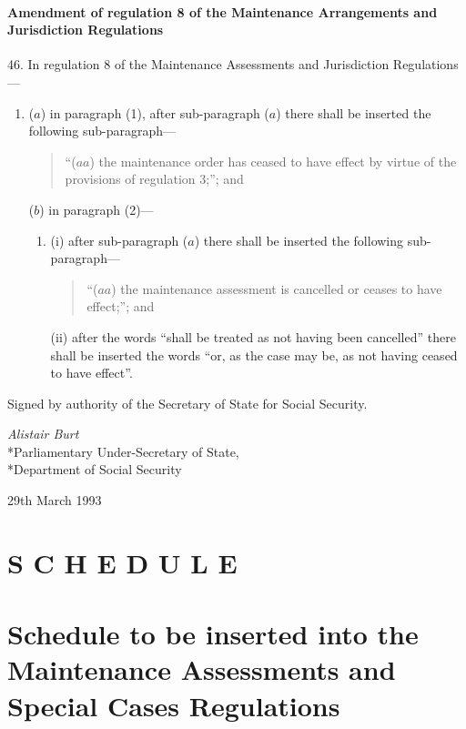 \documentclass[a4paper]{article}
\newcommand{\parthead}{}
\begin{document}
\subsection[46. Amendment of regulation 8 of the Maintenance Arrangements and Jurisdiction Regulations]{Amendment of regulation 8 of the Maintenance Arrangements and Jurisdiction Regulations}

46.  In regulation 8 of the Maintenance Assessments and Jurisdiction Regulations—
\begin{enumerate}\item[]
($a$) in paragraph (1), after sub-paragraph ($a$) there shall be inserted the following sub-paragraph---
\begin{quotation}
“($aa$) the maintenance order has ceased to have effect by virtue of the provisions of regulation 3;”; and
\end{quotation}

($b$) in paragraph (2)---
\begin{enumerate}\item[]
(i) after sub-paragraph ($a$) there shall be inserted the following sub-paragraph---
\begin{quotation}
“($aa$) the maintenance assessment is cancelled or ceases to have effect;”; and
\end{quotation}

(ii) after the words “shall be treated as not having been cancelled” there shall be inserted the words “or, as the case may be, as not having ceased to have effect”.
\end{enumerate}
\end{enumerate}

\bigskip

Signed by authority of the Secretary of State for Social Security.

{\raggedleft
\emph{Alistair Burt}\\*Parliamentary Under-Secretary of State,\\*Department of Social Security

}

29th March 1993

\clearpage

\part*{S C H E D U L E}

\renewcommand\parthead{--- Schedule}

\part[Schedule --- Schedule to be inserted into the Maintenance Assessments and Special Cases Regulations]{Schedule to be inserted into the Maintenance Assessments and Special Cases Regulations}
\end{document}

